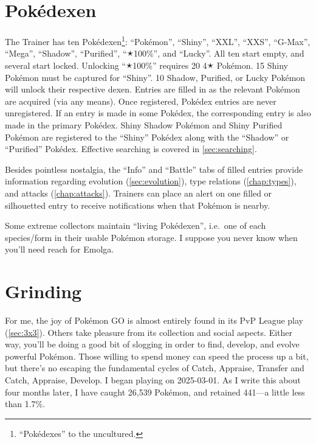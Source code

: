 \section{Pokédexen\label{sec:dexen}}
The Trainer has ten Pokédexen\footnote{``Pokédexes'' to the uncultured.}:
  ``Pokémon'', ``Shiny'', ``XXL'', ``XXS'', ``G-Max'', ``Mega'', ``Shadow'',
  ``Purified'', ``🟉100\%'', and ``Lucky''.
All ten start empty, and several start locked.
Unlocking ``🟉100\%'' requires 20 4🟉 Pokémon.
15 Shiny Pokémon must be captured for ``Shiny''.
10 Shadow, Purified, or Lucky Pokémon will unlock their respective dexen.
Entries are filled in as the relevant Pokémon are acquired (via any means).
Once registered, Pokédex entries are never unregistered.
If an entry is made in some Pokédex, the corresponding entry is also made
  in the primary Pokédex.
Shiny Shadow Pokémon and Shiny Purified Pokémon are registered to the
  ``Shiny'' Pokédex along with the ``Shadow'' or ``Purified'' Pokédex.
Effective searching is covered in \autoref{sec:searching}.

Besides pointless nostalgia, the ``Info'' and ``Battle'' tabs of filled entries
  provide information regarding evolution (\autoref{sec:evolution}), type
  relations (\autoref{chap:types}), and attacks (\autoref{chap:attacks}).
Trainers can place an alert on one filled or silhouetted entry to receive
  notifications when that Pokémon is nearby.

\begin{tipbox}[title=Living Pokédexen]
Some extreme collectors maintain ``living Pokédexen'', i.e.\ one of each
  species/form in their usable Pokémon storage.
I suppose you never know when you'll need reach for Emolga.
\end{tipbox}

\section{Grinding\label{sec:grinding}}
For me, the joy of Pokémon GO is almost entirely found in its PvP League play (\autoref{sec:3x3}).
Others take pleasure from its collection and social aspects.
Either way, you'll be doing a good bit of slogging in order to find, develop,
  and evolve powerful Pokémon.
Those willing to spend money can speed the process up a bit, but there's
  no escaping the fundamental cycles of Catch, Appraise, Transfer and
  Catch, Appraise, Develop. 
I began playing on 2025-03-01.
As I write this about four months later, I have caught 26,539 Pokémon, and retained 441---a little less than 1.7\%.

